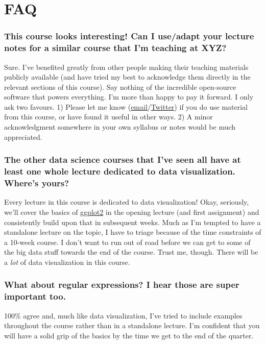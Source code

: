 \documentclass[12]{article}
\begin{document}
\newpage
\section*{FAQ}

\vspace{-0.25cm}
\subsubsection*{This course looks interesting! Can I use/adapt your lecture notes for a similar course that I'm teaching at XYZ?}
Sure. I've benefited greatly from other people making their teaching materials publicly available (and have tried my best to acknowledge them directly in the relevant sections of this course). Say nothing of the incredible open-source software that powers everything. I'm more than happy to pay it forward. I only ask two favours. 1) Please let me know (\href{mailto:grantmcd@uoregon.edu}{email}/\href{https://twitter.com/grant_mcdermott}{Twitter}) if you do use material from this course, or have found it useful in other ways. 2) A minor acknowledgment somewhere in your own syllabus or notes would be much appreciated.

\vspace{-0.25cm}
\subsubsection*{The other data science courses that I've seen all have at least one whole lecture dedicated to data visualization. Where's yours?}
Every lecture in this course is dedicated to data visualization! Okay, seriously, we'll cover the basics of \href{https://ggplot2.tidyverse.org/}{ggplot2} in the opening lecture (and first assignment) and consistently build upon that in subsequent weeks. Much as I'm tempted to have a standalone lecture on the topic, I have to triage because of the time constraints of a 10-week course. I don't want to run out of road before we can get to some of the big data stuff towards the end of the course. Trust me, though. There will be a \textit{lot} of data visualization in this course. 

\vspace{-0.25cm}
\subsubsection*{What about regular expressions? I hear those are super important too.}
100\% agree and, much like data visualization, I've tried to include examples throughout the course rather than in a standalone lecture. I'm confident that you will have a solid grip of the basics by the time we get to the end of the quarter.
\end{document}
